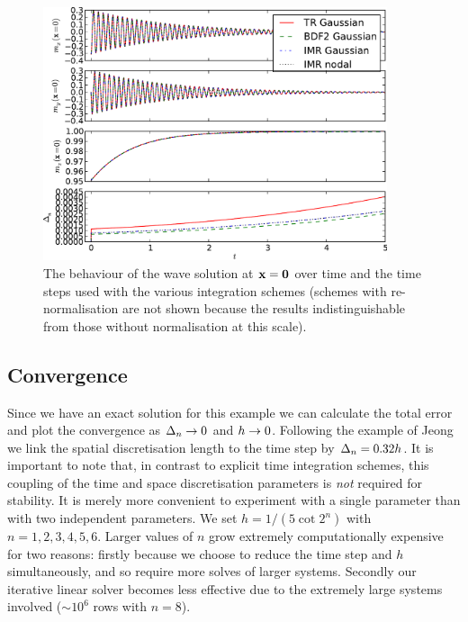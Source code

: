 \begin{figure}
  \centering
  \includegraphics[width=0.9\textwidth]{plots/2d_wave_solution_time_trace/get2oftracevaluesvs-get3oftracevaluesvs-get4oftracevaluesvs-dtsvstimes.pdf}
  \caption{The behaviour of the wave solution at $\boldsymbol{\mathrm{x}} = \mathbf{0}$ over time and the time steps used with the various integration schemes (schemes with re-normalisation are not shown because the results indistinguishable from those without normalisation at this scale).}
  \label{fig:2d-wave-time-trace}
\end{figure}


\subsection{Convergence}

Since we have an exact solution for this example we can calculate the total error and plot the convergence as $\Delta_{n} \rightarrow 0$ and $h \rightarrow 0$.
Following the example of Jeong \etal \cite{Jeong2014} we link the spatial discretisation length to the time step by $\Delta_{n} = 0.32h$.
It is important to note that, in contrast to explicit time integration schemes, this coupling of the time and space discretisation parameters is \emph{not} required for stability.
It is merely more convenient to experiment with a single parameter than with two independent parameters.
We set $h = 1/(5 \cot 2^n)$ with $n=1,2,3,4,5,6$.
Larger values of $n$ grow extremely computationally expensive for two reasons: firstly because we choose to reduce the time step and $h$ simultaneously, and so require more solves of larger systems.
Secondly our iterative linear solver becomes less effective due to the extremely large systems involved ($\sim 10^6$ rows with $n=8$).

